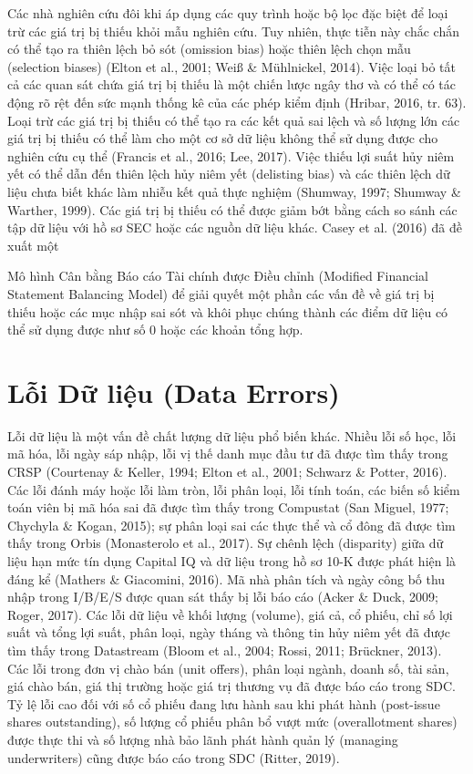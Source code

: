 Các nhà nghiên cứu đôi khi áp dụng các quy trình hoặc bộ lọc đặc biệt để loại trừ các giá trị bị thiếu khỏi mẫu nghiên cứu. Tuy nhiên, thực tiễn này chắc chắn có thể tạo ra thiên lệch bỏ sót (omission bias) hoặc thiên lệch chọn mẫu (selection biases) (Elton et al., 2001; Weiß \& Mühlnickel, 2014). Việc loại bỏ tất cả các quan sát chứa giá trị bị thiếu là một chiến lược ngây thơ và có thể có tác động rõ rệt đến sức mạnh thống kê của các phép kiểm định (Hribar, 2016, tr. 63). Loại trừ các giá trị bị thiếu có thể tạo ra các kết quả sai lệch và số lượng lớn các giá trị bị thiếu có thể làm cho một cơ sở dữ liệu không thể sử dụng được cho nghiên cứu cụ thể (Francis et al., 2016; Lee, 2017). Việc thiếu lợi suất hủy niêm yết có thể dẫn đến thiên lệch hủy niêm yết (delisting bias) và các thiên lệch dữ liệu chưa biết khác làm nhiễu kết quả thực nghiệm (Shumway, 1997; Shumway \& Warther, 1999). Các giá trị bị thiếu có thể được giảm bớt bằng cách so sánh các tập dữ liệu với hồ sơ SEC hoặc các nguồn dữ liệu khác. Casey et al. (2016) đã đề xuất một

Mô hình Cân bằng Báo cáo Tài chính được Điều chỉnh (Modified Financial Statement Balancing Model) để giải quyết một phần các vấn đề về giá trị bị thiếu hoặc các mục nhập sai sót và khôi phục chúng thành các điểm dữ liệu có thể sử dụng được như số 0 hoặc các khoản tổng hợp.

\section{Lỗi Dữ liệu (Data Errors)}

Lỗi dữ liệu là một vấn đề chất lượng dữ liệu phổ biến khác. Nhiều lỗi số học, lỗi mã hóa, lỗi ngày sáp nhập, lỗi vị thế danh mục đầu tư đã được tìm thấy trong CRSP (Courtenay \& Keller, 1994; Elton et al., 2001; Schwarz \& Potter, 2016). Các lỗi đánh máy hoặc lỗi làm tròn, lỗi phân loại, lỗi tính toán, các biến số kiểm toán viên bị mã hóa sai đã được tìm thấy trong Compustat (San Miguel, 1977; Chychyla \& Kogan, 2015); sự phân loại sai các thực thể và cổ đông đã được tìm thấy trong Orbis (Monasterolo et al., 2017). Sự chênh lệch (disparity) giữa dữ liệu hạn mức tín dụng Capital IQ và dữ liệu trong hồ sơ 10-K được phát hiện là đáng kể (Mathers \& Giacomini, 2016). Mã nhà phân tích và ngày công bố thu nhập trong I/B/E/S được quan sát thấy bị lỗi báo cáo (Acker \& Duck, 2009; Roger, 2017). Các lỗi dữ liệu về khối lượng (volume), giá cả, cổ phiếu, chỉ số lợi suất và tổng lợi suất, phân loại, ngày tháng và thông tin hủy niêm yết đã được tìm thấy trong Datastream (Bloom et al., 2004; Rossi, 2011; Brückner, 2013). Các lỗi trong đơn vị chào bán (unit offers), phân loại ngành, doanh số, tài sản, giá chào bán, giá thị trường hoặc giá trị thương vụ đã được báo cáo trong SDC. Tỷ lệ lỗi cao đối với số cổ phiếu đang lưu hành sau khi phát hành (post-issue shares outstanding), số lượng cổ phiếu phân bổ vượt mức (overallotment shares) được thực thi và số lượng nhà bảo lãnh phát hành quản lý (managing underwriters) cũng được báo cáo trong SDC (Ritter, 2019).

